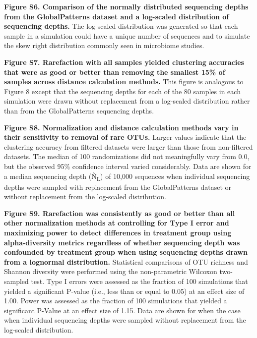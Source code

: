 \documentclass[
]{article}
\begin{document}
\textbf{Figure S6. Comparison of the normally distributed sequencing
depths from the GlobalPatterns dataset and a log-scaled distribution of
sequencing depths.} The log-scaled distribution was generated so that
each sample in a simulation could have a unique number of sequences and
to simulate the skew right distribution commonly seen in microbiome
studies.

\textbf{Figure S7. Rarefaction with all samples yielded clustering
accuracies that were as good or better than removing the smallest 15\%
of samples across distance calculation methods.} This figure is
analogous to Figure 8 except that the sequencing depths for each of the
80 samples in each simulation were drawn without replacement from a
log-scaled distribution rather than from the GlobalPatterns sequencing
depths.

\textbf{Figure S8. Normalization and distance calculation methods vary
in their sensitivity to removal of rare OTUs.} Larger values indicate
that the clustering accuracy from filtered datasets were larger than
those from non-filtered datasets. The median of 100 randomizations did
not meaningfully vary from 0.0, but the observed 95\% confidence
interval varied considerably. Data are shown for a median sequencing
depth (Ñ\textsubscript{L}) of 10,000 sequences when individual
sequencing depths were sampled with replacement from the GlobalPatterns
dataset or without replacement from the log-scaled distribution.

\textbf{Figure S9. Rarefaction was consistently as good or better than
all other normalization methods at controlling for Type I error and
maximizing power to detect differences in treatment group using
alpha-diversity metrics regardless of whether sequencing depth was
confounded by treatment group when using sequencing depths drawn from a
lognormal distribution.} Statistical comparisons of OTU richness and
Shannon diversity were performed using the non-parametric Wilcoxon
two-sampled test. Type I errors were assessed as the fraction of 100
simulations that yielded a significant P-value (i.e., less than or equal
to 0.05) at an effect size of 1.00. Power was assessed as the fraction
of 100 simulations that yielded a significant P-Value at an effect size
of 1.15. Data are shown for when the case when individual sequencing
depths were sampled without replacement from the log-scaled
distribution.
\end{document}
